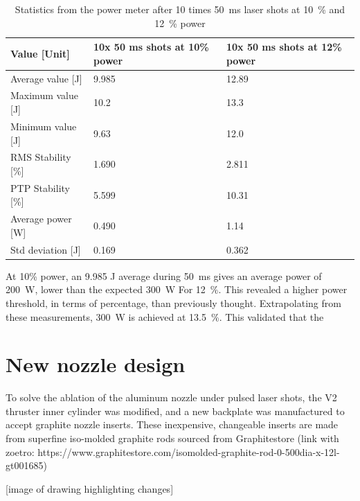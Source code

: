                 \begin{table}[!ht]
                    \caption{Statistics from the power meter after 10 times \qty{50}{ms} laser shots at \qty{10}{\%} and \qty{12}{\%} power}
                    \label{tab:laser shot statistics}
                    \begin{tabular}{lll}
                    \textbf{Value {[}Unit{]}} & \textbf{10x 50 ms shots at 10\% power} & \textbf{10x 50 ms shots at 12\% power} \\ \hline
                    Average value {[}J{]}  & 9.985 & 12.89 \\
                    Maximum value {[}J{]}  & 10.2  & 13.3  \\
                    Minimum value {[}J{]}  & 9.63  & 12.0  \\
                    RMS Stability {[}\%{]} & 1.690 & 2.811 \\
                    PTP Stability {[}\%{]} & 5.599 & 10.31 \\
                    Average power {[}W{]}  & 0.490 & 1.14  \\
                    Std deviation {[}J{]}  & 0.169 & 0.362 \\ \hline
                    \end{tabular}
                \end{table}
                
                At 10\% power, an 9.985 J average during \qty{50}{ms} gives an average power of \qty{200}{W}, lower than the expected \qty{300}{W} For \qty{12}{\%}. This revealed a higher power threshold, in terms of percentage, than previously thought. Extrapolating from these measurements, \qty{300}{W} is achieved at \qty{13.5}{\%}. This validated that the

            \section{New nozzle design}
            
                To solve the ablation of the aluminum nozzle under pulsed laser shots, the V2 thruster inner cylinder was modified, and a new backplate was manufactured to accept graphite nozzle inserts. These inexpensive, changeable inserts are made from superfine iso-molded graphite rods sourced from Graphitestore (link with zoetro: https://www.graphitestore.com/isomolded-graphite-rod-0-500dia-x-12l-gt001685)
    
                [image of drawing highlighting changes]